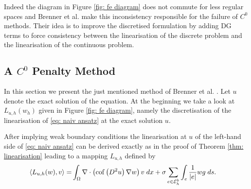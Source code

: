 Indeed the diagram in Figure \ref{fig: fe diagram} does not commute for less regular spaces and Brenner et al. make this inconsistency responsible for the failure of $C^0$ methods\cite{BGN+2011}. Their idea is to improve the discretised formulation by adding DG terms to force consistency between the linearisation of the discrete problem and the linearisation of the continuous problem.

\subsection{A $C^0$ Penalty Method }\label{sec: Brenner method}

In this section we present the just mentioned method of Brenner et al. \cite{BGN+2011}. Let $u$ denote the exact solution of the \MA equation. 
At the beginning we take a look at $L_{u,h}(w_h)$ given in Figure \ref{fig: fe diagram}, namely the discretisation of the linearisation of \eqref{eq: naiv ansatz} at the exact solution $u$.

After implying weak boundary conditions the linearisation at $u$ of the left-hand side of \eqref{eq: naiv ansatz} can be derived exactly as in the proof of Theorem \ref{thm: linearisation} leading to a mapping $L_{u,h}$ defined by
\begin{align}
\langle L_{u,h}(w),v\rangle =& \int_{\Omega} {{\nabla \cdot \left( \operatorname{cof} \left( D^2 u  \right) \nabla w \right) v}\;dx} 
+ \sigma \sum_{e \in \mathcal{E}_h^b} \int_{e} {{\frac 1 {|e|}{w}{g}}\;ds}.
\label{eq: linearOperator}
\end{align}

